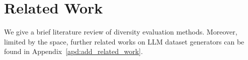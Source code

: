 \section{Related Work}
We give a brief literature review of diversity evaluation methods. Moreover, limited by the space, further related works on LLM dataset generators can be found in Appendix~\ref{apd:add_related_work}. 

% 


